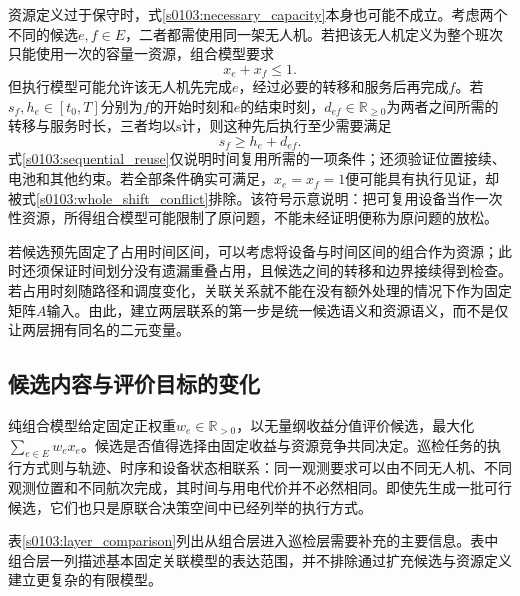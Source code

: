 资源定义过于保守时，式\eqref{s0103:necessary_capacity}本身也可能不成立。考虑两个不同的候选$e,f\in E$，二者都需使用同一架无人机。若把该无人机定义为整个班次只能使用一次的容量一资源，组合模型要求
\begin{equation}
 x_e+x_f\leq1.
 \label{s0103:whole_shift_conflict}
\end{equation}
但执行模型可能允许该无人机先完成$e$，经过必要的转移和服务后再完成$f$。若$s_f,h_e\in[t_0,T]$分别为$f$的开始时刻和$e$的结束时刻，$d_{ef}\in\mathbb R_{\geq0}$为两者之间所需的转移与服务时长，三者均以$\mathrm s$计，则这种先后执行至少需要满足
\begin{equation}
 s_f\geq h_e+d_{ef}.
 \label{s0103:sequential_reuse}
\end{equation}
式\eqref{s0103:sequential_reuse}仅说明时间复用所需的一项条件；还须验证位置接续、电池和其他约束。若全部条件确实可满足，$x_e=x_f=1$便可能具有执行见证，却被式\eqref{s0103:whole_shift_conflict}排除。该符号示意说明：把可复用设备当作一次性资源，所得组合模型可能限制了原问题，不能未经证明便称为原问题的放松。

若候选预先固定了占用时间区间，可以考虑将设备与时间区间的组合作为资源；此时还须保证时间划分没有遗漏重叠占用，且候选之间的转移和边界接续得到检查。若占用时刻随路径和调度变化，关联关系就不能在没有额外处理的情况下作为固定矩阵$A$输入。由此，建立两层联系的第一步是统一候选语义和资源语义，而不是仅让两层拥有同名的二元变量。

\subsection{候选内容与评价目标的变化}

纯组合模型给定固定正权重$w_e\in\mathbb R_{>0}$，以无量纲收益分值评价候选，最大化$\sum_{e\in E}w_ex_e$。候选是否值得选择由固定收益与资源竞争共同决定。巡检任务的执行方式则与轨迹、时序和设备状态相联系：同一观测要求可以由不同无人机、不同观测位置和不同航次完成，其时间与用电代价并不必然相同。即使先生成一批可行候选，它们也只是原联合决策空间中已经列举的执行方式。

表\ref{s0103:layer_comparison}列出从组合层进入巡检层需要补充的主要信息。表中组合层一列描述基本固定关联模型的表达范围，并不排除通过扩充候选与资源定义建立更复杂的有限模型。

